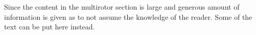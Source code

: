 Since the content in the multirotor section is large and generous amount of information is given as to not assume the knowledge of the reader. Some of the text can be put here instead.